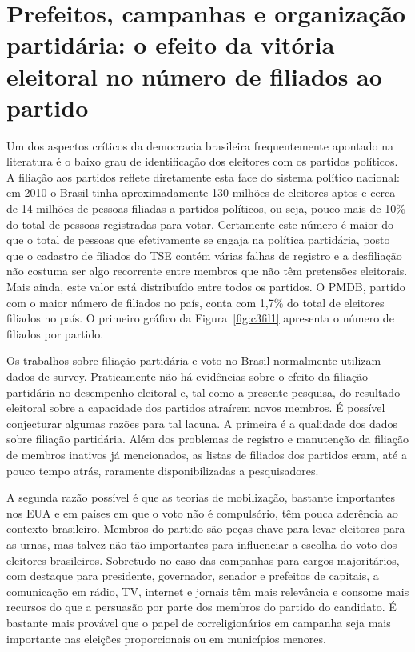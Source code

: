 \section{Prefeitos, campanhas e organização partidária: o efeito da vitória eleitoral no número de filiados ao partido}

Um dos aspectos críticos da democracia brasileira frequentemente apontado na literatura é o baixo grau de identificação dos eleitores com os partidos políticos. A filiação aos partidos reflete diretamente esta face do sistema político nacional: em 2010 o Brasil tinha aproximadamente 130 milhões de eleitores aptos e cerca de 14 milhões de pessoas filiadas a partidos políticos, ou seja, pouco mais de 10\% do total de pessoas registradas para votar. Certamente este número é maior do que o total de pessoas que efetivamente se engaja na política partidária, posto que o cadastro de filiados do TSE contém várias falhas de registro e a desfiliação não costuma ser algo recorrente entre membros que não têm pretensões eleitorais. Mais ainda, este valor está distribuído entre todos os partidos. O PMDB, partido com o maior número de filiados no país, conta com 1,7\% do total de eleitores filiados no país. O primeiro gráfico da Figura~\ref{fig:c3fil1} apresenta o número de filiados por partido.

Os trabalhos sobre filiação partidária e voto no Brasil normalmente utilizam dados de survey. Praticamente não há evidências sobre o efeito da filiação partidária no desempenho eleitoral e, tal como a presente pesquisa, do resultado eleitoral sobre a capacidade dos partidos atraírem novos membros. É possível conjecturar algumas razões para tal lacuna. A primeira é a qualidade dos dados sobre filiação partidária. Além dos problemas de registro e manutenção da filiação de membros inativos já mencionados, as listas de filiados dos partidos eram, até a pouco tempo atrás, raramente disponibilizadas a pesquisadores.

A segunda razão possível é que as teorias de mobilização, bastante importantes nos EUA e em países em que o voto não é compulsório, têm pouca aderência ao contexto brasileiro. Membros do partido são peças chave para levar eleitores para as urnas, mas talvez não tão importantes para influenciar a escolha do voto dos eleitores brasileiros. Sobretudo no caso das campanhas para cargos majoritários, com destaque para presidente, governador, senador e prefeitos de capitais, a comunicação em rádio, TV, internet e jornais têm mais relevância e consome mais recursos do que a persuasão por parte dos membros do partido do candidato. É bastante mais provável que o papel de correligionários em campanha seja mais importante nas eleições proporcionais ou em municípios menores.

